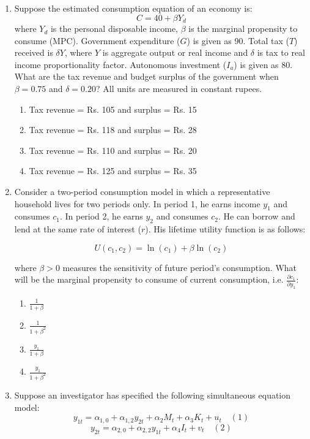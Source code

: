 \documentclass[journal,12pt,onecolumn]{exam}
\theoremstyle{remark}
\begin{document}
\begin{enumerate}
  \item Suppose the estimated consumption equation of an economy is:
  \[
    C = 40 + \beta Y_d
  \]
  where $Y_d$ is the personal disposable income, $\beta$ is the marginal propensity to consume (MPC). Government expenditure ($G$) is given as 90. Total tax ($T$) received is $\delta Y$, where $Y$ is aggregate output or real income and $\delta$ is tax to real income proportionality factor. Autonomous investment ($I_a$) is given as 80. What are the tax revenue and budget surplus of the government when $\beta = 0.75$ and $\delta = 0.20$? All units are measured in constant rupees.

  \begin{enumerate}
    \item Tax revenue = Rs. 105 and surplus = Rs. 15
    \item Tax revenue = Rs. 118 and surplus = Rs. 28
    \item Tax revenue = Rs. 110 and surplus = Rs. 20
    \item Tax revenue = Rs. 125 and surplus = Rs. 35
  \end{enumerate}

\item Consider a two-period consumption model in which a representative household lives for two periods only. In period 1, he earns income $y_1$ and consumes $c_1$. In period 2, he earns $y_2$ and consumes $c_2$. He can borrow and lend at the same rate of interest ($r$). His lifetime utility function is as follows:

  \[
  U(c_1, c_2) = \ln(c_1) + \beta \ln(c_2)
  \]

  where $\beta > 0$ measures the sensitivity of future period's consumption. What will be the marginal propensity to consume of current consumption, i.e. $\frac{\partial c_1}{\partial y_1}$:

  \begin{enumerate}[label=(\Alph*)]
    \item $\frac{1}{1+\beta}$
    \item $\frac{1}{1+\beta^2}$
    \item $\frac{y_1}{1+\beta}$
    \item $\frac{y_1}{1+\beta^2}$
  \end{enumerate}
  \newpage

  \item Suppose an investigator has specified the following simultaneous equation model:
  \[
  y_{1t} = \alpha_{1,0} + \alpha_{1,2} y_{2t} + \alpha_{2} M_t + \alpha_3 K_t + u_t \quad (1)
  \]
  \[
  y_{2t} = \alpha_{2,0} + \alpha_{2,2} y_{1t} + \alpha_4 I_t + v_t \quad (2)
  \]


\end{enumerate}
\end{document}
